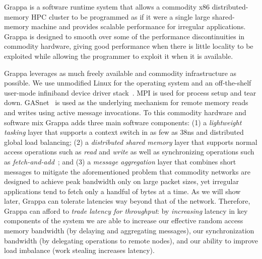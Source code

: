 Grappa is a software runtime system that allows a commodity x86 distributed-memory HPC cluster to be programmed as if it were a single large shared-memory machine and provides scalable performance for irregular applications. Grappa is designed to smooth over some of the performance discontinuities in commodity hardware, giving good performance when there is little locality to be exploited while allowing the programmer to exploit it when it is available.

Grappa leverages as much freely available and commodity infrastructure as possible. We use unmodified Linux for the operating system and an off-the-shelf user-mode infiniband device driver stack~\cite{OFED}. MPI is used for process setup and tear down. GASnet~\cite{gasnet} is used as the underlying mechanism for remote memory reads and writes using active message invocations. To this commodity hardware and software mix Grappa adds three main software components: (1) a \emph{lightweight tasking\/} layer that supports a context switch in as few as 38ns and distributed global load balancing; (2) a \emph{distributed shared memory\/} layer that supports normal access operations such as \emph{read\/} and \emph{write\/} as well as synchronizing operations such as \emph{fetch-and-add\/}~\cite{fetchandadd}; and (3) a \emph{message aggregation\/} layer that combines short messages to mitigate the aforementioned problem that commodity networks are designed to achieve peak bandwidth only on large packet sizes, yet irregular applications tend to fetch only a handful of bytes at a time. As we will show later, Grappa can tolerate latencies way beyond that of the network. Therefore, Grappa can afford to \emph{trade latency for throughput\/}: by {\em increasing\/} latency in key components of the system we are able to increase our effective random access memory bandwidth (by delaying and aggregating messages), our synchronization bandwidth (by delegating operations to remote nodes), and our ability to improve load imbalance (work stealing increases latency).

